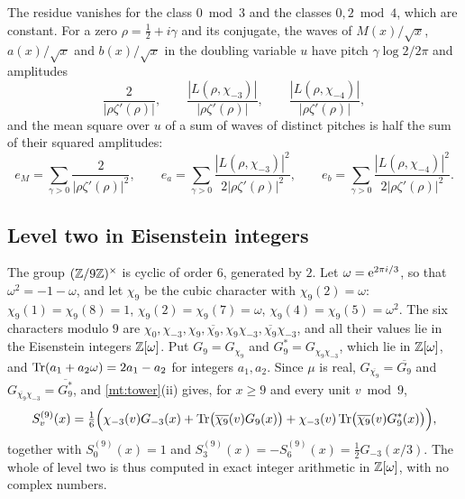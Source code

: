 \documentclass[11pt]{article}
\theoremstyle{definition}\newtheorem{definition}[theorem]{Definition}
\theoremstyle{remark}\newtheorem{remark}[theorem]{Remark}
\theoremstyle{definition}\newtheorem{axiom}{Axiom}
\begin{document}
The residue vanishes for the class $0\bmod3$ and the classes $0,2\bmod4$, which are constant. For a zero $\rho=\frac12+i\gamma$ and its conjugate, the waves of $M(x)/\sqrt x$, $a(x)/\sqrt x$ and $b(x)/\sqrt x$ in the doubling variable $u$ have pitch $\gamma\log2/2\pi$ and amplitudes
\begin{equation}\label{eq:amps}
\frac2{|\rho\zeta'(\rho)|},\qquad\frac{|L(\rho,\chi_{-3})|}{|\rho\zeta'(\rho)|},\qquad\frac{|L(\rho,\chi_{-4})|}{|\rho\zeta'(\rho)|},
\end{equation}
and the mean square over $u$ of a sum of waves of distinct pitches is half the sum of their squared amplitudes:
\begin{equation}\label{eq:energies}
e_M=\sum_{\gamma>0}\frac2{|\rho\zeta'(\rho)|^2},\qquad e_a=\sum_{\gamma>0}\frac{|L(\rho,\chi_{-3})|^2}{2|\rho\zeta'(\rho)|^2},\qquad e_b=\sum_{\gamma>0}\frac{|L(\rho,\chi_{-4})|^2}{2|\rho\zeta'(\rho)|^2}.
\end{equation}

\subsection{Level two in Eisenstein integers}\label{sec:eisenstein}

The group $(\mathbb Z/9\mathbb Z)^\times$ is cyclic of order $6$, generated by $2$. Let $\omega=\mathrm e^{2\pi i/3}$, so that $\omega^2=-1-\omega$, and let $\chi_9$ be the cubic character with $\chi_9(2)=\omega$: $\chi_9(1)=\chi_9(8)=1$, $\chi_9(2)=\chi_9(7)=\omega$, $\chi_9(4)=\chi_9(5)=\omega^2$. The six characters modulo $9$ are $\chi_0,\chi_{-3},\chi_9,\overline{\chi_9},\chi_9\chi_{-3},\overline{\chi_9}\chi_{-3}$, and all their values lie in the Eisenstein integers $\mathbb Z[\omega]$. Put $G_9=G_{\chi_9}$ and $G_9^*=G_{\chi_9\chi_{-3}}$, which lie in $\mathbb Z[\omega]$, and $\operatorname{Tr}(a_1+a_2\omega)=2a_1-a_2$ for integers $a_1,a_2$. Since $\mu$ is real, $G_{\overline{\chi_9}}=\overline{G_9}$ and $G_{\overline{\chi_9}\chi_{-3}}=\overline{G_9^*}$, and \cref{mt:tower}(ii) gives, for $x\ge9$ and every unit $v\bmod9$,
\begin{equation}\label{eq:level2}
S^{(9)}_v(x)=\tfrac16\Bigl(\chi_{-3}(v)G_{-3}(x)+\operatorname{Tr}\bigl(\overline{\chi_9}(v)G_9(x)\bigr)+\chi_{-3}(v)\operatorname{Tr}\bigl(\overline{\chi_9}(v)G_9^*(x)\bigr)\Bigr),
\end{equation}
together with $S^{(9)}_0(x)=1$ and $S^{(9)}_3(x)=-S^{(9)}_6(x)=\frac12G_{-3}(x/3)$. The whole of level two is thus computed in exact integer arithmetic in $\mathbb Z[\omega]$, with no complex numbers.
\end{document}
